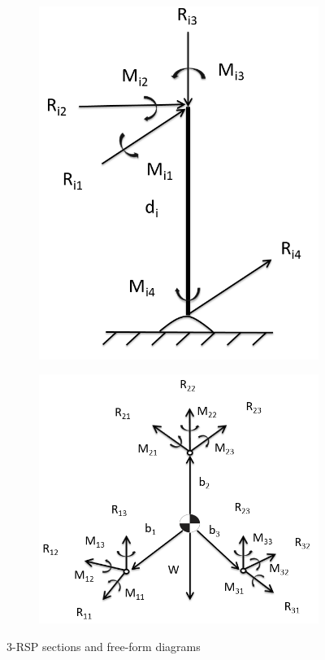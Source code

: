 \documentclass[titlepage, letterpaper]{article}
\begin{document}
\begin{figure}[htbp]
\begin{subfigure}[b]{0.45\textwidth}
\end{subfigure}
\begin{subfigure}[b]{0.45\textwidth}
\includegraphics[width=1\linewidth]{static03}
\end{subfigure}
\begin{subfigure}[b]{0.45\textwidth}
\includegraphics[width=1\linewidth]{static04}
\end{subfigure}
\caption{3-RSP sections and free-form diagrams}
\label{fig:static}
\end{figure}
\end{document}
